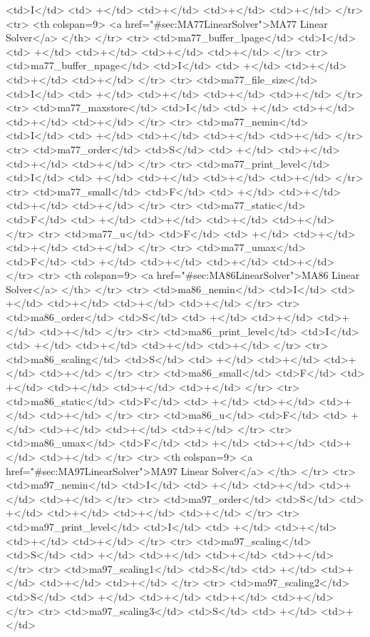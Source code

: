{{<td>I</td>
<td> +</td>
<td>+</td>
<td>+</td>
<td>+</td>
</tr>
<tr>   <th colspan=9> <a href="#sec:MA77LinearSolver">MA77 Linear Solver</a> </th>
</tr>
<tr>
<td>ma77_buffer_lpage</td>
<td>I</td>
<td> +</td>
<td>+</td>
<td>+</td>
<td>+</td>
</tr>
<tr>
<td>ma77_buffer_npage</td>
<td>I</td>
<td> +</td>
<td>+</td>
<td>+</td>
<td>+</td>
</tr>
<tr>
<td>ma77_file_size</td>
<td>I</td>
<td> +</td>
<td>+</td>
<td>+</td>
<td>+</td>
</tr>
<tr>
<td>ma77_maxstore</td>
<td>I</td>
<td> +</td>
<td>+</td>
<td>+</td>
<td>+</td>
</tr>
<tr>
<td>ma77_nemin</td>
<td>I</td>
<td> +</td>
<td>+</td>
<td>+</td>
<td>+</td>
</tr>
<tr>
<td>ma77_order</td>
<td>S</td>
<td> +</td>
<td>+</td>
<td>+</td>
<td>+</td>
</tr>
<tr>
<td>ma77_print_level</td>
<td>I</td>
<td> +</td>
<td>+</td>
<td>+</td>
<td>+</td>
</tr>
<tr>
<td>ma77_small</td>
<td>F</td>
<td> +</td>
<td>+</td>
<td>+</td>
<td>+</td>
</tr>
<tr>
<td>ma77_static</td>
<td>F</td>
<td> +</td>
<td>+</td>
<td>+</td>
<td>+</td>
</tr>
<tr>
<td>ma77_u</td>
<td>F</td>
<td> +</td>
<td>+</td>
<td>+</td>
<td>+</td>
</tr>
<tr>
<td>ma77_umax</td>
<td>F</td>
<td> +</td>
<td>+</td>
<td>+</td>
<td>+</td>
</tr>
<tr>   <th colspan=9> <a href="#sec:MA86LinearSolver">MA86 Linear Solver</a> </th>
</tr>
<tr>
<td>ma86_nemin</td>
<td>I</td>
<td> +</td>
<td>+</td>
<td>+</td>
<td>+</td>
</tr>
<tr>
<td>ma86_order</td>
<td>S</td>
<td> +</td>
<td>+</td>
<td>+</td>
<td>+</td>
</tr>
<tr>
<td>ma86_print_level</td>
<td>I</td>
<td> +</td>
<td>+</td>
<td>+</td>
<td>+</td>
</tr>
<tr>
<td>ma86_scaling</td>
<td>S</td>
<td> +</td>
<td>+</td>
<td>+</td>
<td>+</td>
</tr>
<tr>
<td>ma86_small</td>
<td>F</td>
<td> +</td>
<td>+</td>
<td>+</td>
<td>+</td>
</tr>
<tr>
<td>ma86_static</td>
<td>F</td>
<td> +</td>
<td>+</td>
<td>+</td>
<td>+</td>
</tr>
<tr>
<td>ma86_u</td>
<td>F</td>
<td> +</td>
<td>+</td>
<td>+</td>
<td>+</td>
</tr>
<tr>
<td>ma86_umax</td>
<td>F</td>
<td> +</td>
<td>+</td>
<td>+</td>
<td>+</td>
</tr>
<tr>   <th colspan=9> <a href="#sec:MA97LinearSolver">MA97 Linear Solver</a> </th>
</tr>
<tr>
<td>ma97_nemin</td>
<td>I</td>
<td> +</td>
<td>+</td>
<td>+</td>
<td>+</td>
</tr>
<tr>
<td>ma97_order</td>
<td>S</td>
<td> +</td>
<td>+</td>
<td>+</td>
<td>+</td>
</tr>
<tr>
<td>ma97_print_level</td>
<td>I</td>
<td> +</td>
<td>+</td>
<td>+</td>
<td>+</td>
</tr>
<tr>
<td>ma97_scaling</td>
<td>S</td>
<td> +</td>
<td>+</td>
<td>+</td>
<td>+</td>
</tr>
<tr>
<td>ma97_scaling1</td>
<td>S</td>
<td> +</td>
<td>+</td>
<td>+</td>
<td>+</td>
</tr>
<tr>
<td>ma97_scaling2</td>
<td>S</td>
<td> +</td>
<td>+</td>
<td>+</td>
<td>+</td>
</tr>
<tr>
<td>ma97_scaling3</td>
<td>S</td>
<td> +</td>
<td>+</td>
}}
